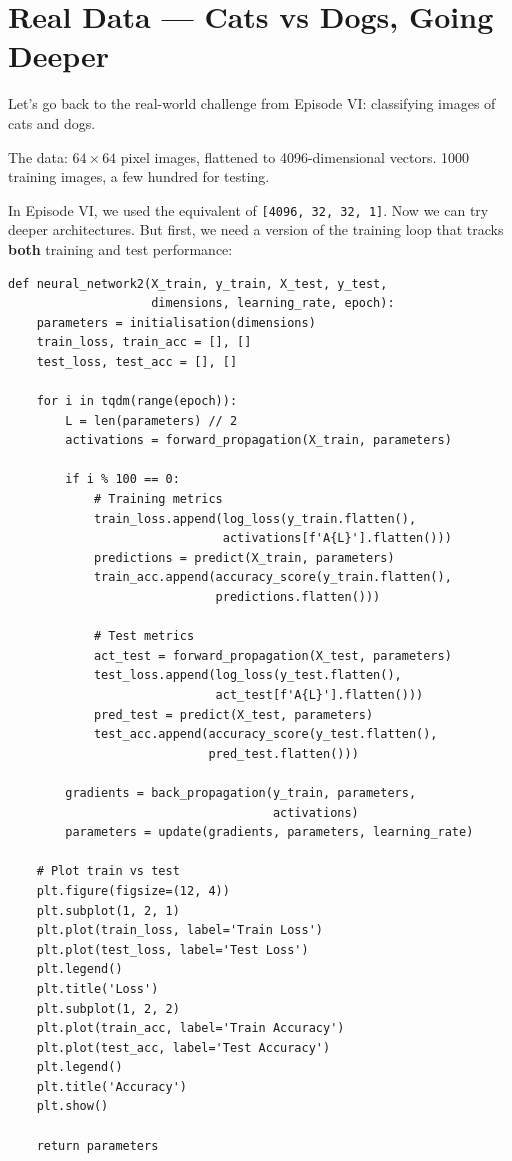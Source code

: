\documentclass[11pt]{article}
\begin{document}
\section{Real Data --- Cats vs Dogs, Going Deeper}

Let's go back to the real-world challenge from Episode VI: classifying images of cats and dogs.

The data: $64 \times 64$ pixel images, flattened to 4096-dimensional vectors. 1000 training images, a few hundred for testing.

In Episode VI, we used the equivalent of \texttt{[4096, 32, 32, 1]}. Now we can try deeper architectures. But first, we need a version of the training loop that tracks \textbf{both} training and test performance:

\begin{lstlisting}
def neural_network2(X_train, y_train, X_test, y_test,
                    dimensions, learning_rate, epoch):
    parameters = initialisation(dimensions)
    train_loss, train_acc = [], []
    test_loss, test_acc = [], []

    for i in tqdm(range(epoch)):
        L = len(parameters) // 2
        activations = forward_propagation(X_train, parameters)

        if i % 100 == 0:
            # Training metrics
            train_loss.append(log_loss(y_train.flatten(),
                              activations[f'A{L}'].flatten()))
            predictions = predict(X_train, parameters)
            train_acc.append(accuracy_score(y_train.flatten(),
                             predictions.flatten()))

            # Test metrics
            act_test = forward_propagation(X_test, parameters)
            test_loss.append(log_loss(y_test.flatten(),
                             act_test[f'A{L}'].flatten()))
            pred_test = predict(X_test, parameters)
            test_acc.append(accuracy_score(y_test.flatten(),
                            pred_test.flatten()))

        gradients = back_propagation(y_train, parameters,
                                     activations)
        parameters = update(gradients, parameters, learning_rate)

    # Plot train vs test
    plt.figure(figsize=(12, 4))
    plt.subplot(1, 2, 1)
    plt.plot(train_loss, label='Train Loss')
    plt.plot(test_loss, label='Test Loss')
    plt.legend()
    plt.title('Loss')
    plt.subplot(1, 2, 2)
    plt.plot(train_acc, label='Train Accuracy')
    plt.plot(test_acc, label='Test Accuracy')
    plt.legend()
    plt.title('Accuracy')
    plt.show()

    return parameters
\end{lstlisting}
\end{document}
